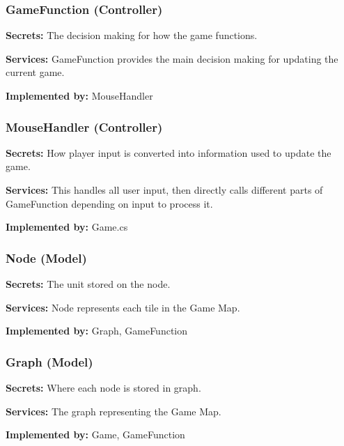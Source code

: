 \documentclass{article}
\begin{document}
\subsubsection{GameFunction (Controller)}
\begin{description}[leftmargin=0.2cm]
    \item \textbf{Secrets:} The decision making for how the game functions.
    \item \textbf{Services:} GameFunction provides the main decision making for updating the current game.
    \item \textbf{Implemented by:} MouseHandler
\end{description}

\subsubsection{MouseHandler (Controller)}
\begin{description}[leftmargin=0.2cm]
    \item \textbf{Secrets:} How player input is converted into information used to update the game.
    \item \textbf{Services:} This handles all user input, then directly calls different parts of GameFunction depending on input to process it.
    \item \textbf{Implemented by:} Game.cs
\end{description}

\subsubsection{Node (Model)}
\begin{description}[leftmargin=0.2cm]
    \item \textbf{Secrets:} The unit stored on the node.
    \item \textbf{Services:} Node represents each tile in the Game Map.
    \item \textbf{Implemented by:} Graph, GameFunction
\end{description}

\subsubsection{Graph (Model)}
\begin{description}[leftmargin=0.2cm]
    \item \textbf{Secrets:} Where each node is stored in graph.
    \item \textbf{Services:} The graph representing the Game Map.
    \item \textbf{Implemented by:} Game, GameFunction
\end{description}
\end{document}
